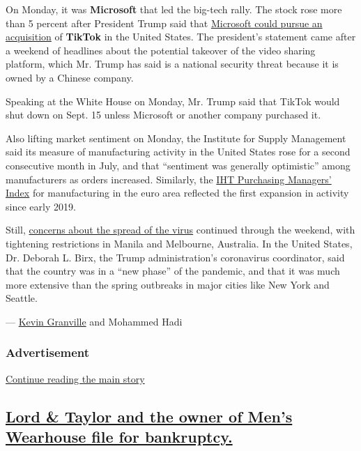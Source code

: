 On Monday, it was \textbf{Microsoft} that led the big-tech rally. The
stock rose more than 5 percent after President Trump said that
\href{https://www.nytimes3xbfgragh.onion/2020/08/03/technology/trump-tiktok-microsoft.html}{Microsoft
could pursue an acquisition} of \textbf{TikTok} in the United States.
The president's statement came after a weekend of headlines about the
potential takeover of the video sharing platform, which Mr. Trump has
said is a national security threat because it is owned by a Chinese
company.

Speaking at the White House on Monday, Mr. Trump said that TikTok would
shut down on Sept. 15 unless Microsoft or another company purchased it.

Also lifting market sentiment on Monday, the Institute for Supply
Management said its measure of manufacturing activity in the United
States rose for a second consecutive month in July, and that ``sentiment
was generally optimistic'' among manufacturers as orders increased.
Similarly, the
\href{https://www.markiteconomics.com/Public/Home/PressRelease/c4e32989182e4296964138d78fcc1305}{IHT
Purchasing Managers' Index} for manufacturing in the euro area reflected
the first expansion in activity since early 2019.

Still,
\href{https://www.nytimes3xbfgragh.onion/2020/08/02/world/coronavirus-covid-19.html?action=click\&module=Top\%20Stories\&pgtype=Homepage}{concerns
about the spread of the virus} continued through the weekend, with
tightening restrictions in Manila and Melbourne, Australia. In the
United States, Dr. Deborah L. Birx, the Trump administration's
coronavirus coordinator, said that the country was in a ``new phase'' of
the pandemic, and that it was much more extensive than the spring
outbreaks in major cities like New York and Seattle.

--- \href{https://www.nytimes3xbfgragh.onion/by/kevin-granville}{Kevin
Granville} and Mohammed Hadi

\hypertarget{advertisement-1}{%
\subsubsection{Advertisement}\label{advertisement-1}}

\protect\hyperlink{after-dfp-ad-mid2}{Continue reading the main story}

\hypertarget{lord--taylor-and-the-owner-of-mens-wearhouse-file-for-bankruptcy}{%
\subsection{\texorpdfstring{\protect\hyperlink{lord-taylor-and-the-owner-of-mens-wearhouse-file-for-bankruptcy}{Lord
\& Taylor and the owner of Men's Wearhouse file for
bankruptcy.}}{Lord \& Taylor and the owner of Men's Wearhouse file for bankruptcy.}}\label{lord--taylor-and-the-owner-of-mens-wearhouse-file-for-bankruptcy}}

